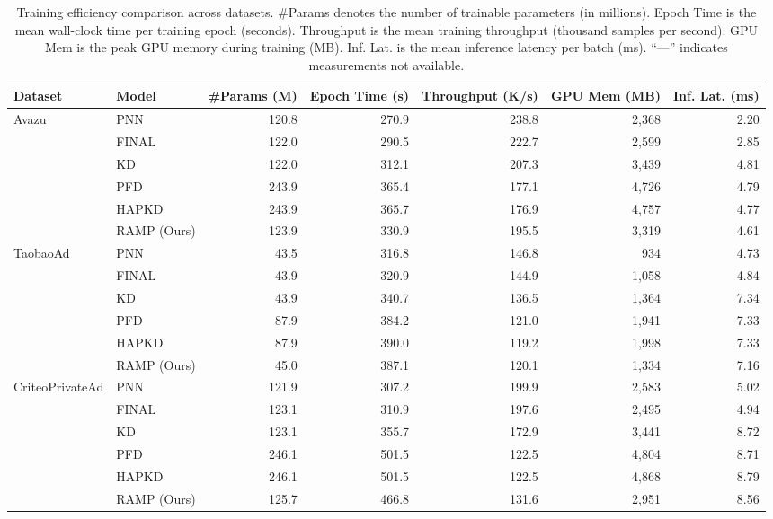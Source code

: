 \begin{table}[h]
    \centering
    \small
    \caption{Training efficiency comparison across datasets. \#Params denotes the number of trainable parameters (in millions). Epoch Time is the mean wall-clock time per training epoch (seconds). Throughput is the mean training throughput (thousand samples per second). GPU Mem is the peak GPU memory during training (MB). Inf. Lat. is the mean inference latency per batch (ms). ``---'' indicates measurements not available.}
    \label{tab:training_efficiency}
    \begin{tabular}{l|l|r|r|r|r|r}
    \hline
    \textbf{Dataset} & \textbf{Model} & \textbf{\#Params (M)} & \textbf{Epoch Time (s)} & \textbf{Throughput (K/s)} & \textbf{GPU Mem (MB)} & \textbf{Inf. Lat. (ms)} \\
    \hline
    \multirow{6}{*}{Avazu}
    & PNN         & 120.8 & 270.9 & 238.8 & 2{,}368 & 2.20 \\
    & FINAL       & 122.0 & 290.5 & 222.7 & 2{,}599 & 2.85 \\
    & KD          & 122.0 & 312.1 & 207.3 & 3{,}439 & 4.81 \\
    & PFD         & 243.9 & 365.4 & 177.1 & 4{,}726 & 4.79 \\
    & HAPKD       & 243.9 & 365.7 & 176.9 & 4{,}757 & 4.77 \\
    & RAMP (Ours)  & 123.9 & 330.9 & 195.5 & 3{,}319 & 4.61 \\
    \hline
    \multirow{6}{*}{TaobaoAd}
    & PNN         &  43.5 & 316.8 & 146.8 &   934 & 4.73 \\
    & FINAL       &  43.9 & 320.9 & 144.9 & 1{,}058 & 4.84 \\
    & KD          &  43.9 & 340.7 & 136.5 & 1{,}364 & 7.34 \\
    & PFD         &  87.9 & 384.2 & 121.0 & 1{,}941 & 7.33 \\
    & HAPKD       &  87.9 & 390.0 & 119.2 & 1{,}998 & 7.33 \\
    & RAMP (Ours)  &  45.0 & 387.1 & 120.1 & 1{,}334 & 7.16 \\
    \hline
    \multirow{6}{*}{CriteoPrivateAd}
    & PNN         & 121.9 & 307.2 & 199.9 & 2{,}583 & 5.02 \\
    & FINAL       & 123.1 & 310.9 & 197.6 & 2{,}495 & 4.94 \\
    & KD          & 123.1 & 355.7 & 172.9 & 3{,}441 & 8.72 \\
    & PFD         & 246.1 & 501.5 & 122.5 & 4{,}804 & 8.71 \\
    & HAPKD         & 246.1 & 501.5 & 122.5 & 4{,}868 & 8.79 \\
    & RAMP (Ours)  & 125.7 & 466.8 & 131.6 & 2{,}951 & 8.56 \\
    \hline
    \end{tabular}
\end{table}

